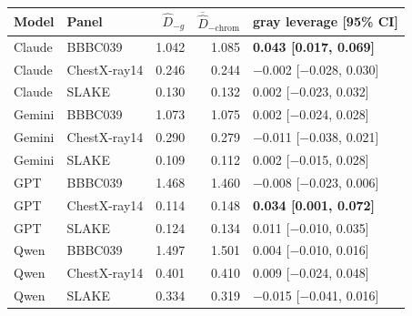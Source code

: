 \begin{tabular}{llrrl}
\toprule
Model & Panel &
$\widehat D_{-g}$ &
$\overline{\widehat D}_{-\mathrm{chrom}}$ &
gray leverage [95\% CI] \\
\midrule
Claude & BBBC039 & 1.042 & 1.085 & \textbf{0.043 [0.017, 0.069]} \\
Claude & ChestX-ray14 & 0.246 & 0.244 & $-$0.002 [$-$0.028, 0.030] \\
Claude & SLAKE & 0.130 & 0.132 & 0.002 [$-$0.023, 0.032] \\
Gemini & BBBC039 & 1.073 & 1.075 & 0.002 [$-$0.024, 0.028] \\
Gemini & ChestX-ray14 & 0.290 & 0.279 & $-$0.011 [$-$0.038, 0.021] \\
Gemini & SLAKE & 0.109 & 0.112 & 0.002 [$-$0.015, 0.028] \\
GPT & BBBC039 & 1.468 & 1.460 & $-$0.008 [$-$0.023, 0.006] \\
GPT & ChestX-ray14 & 0.114 & 0.148 & \textbf{0.034 [0.001, 0.072]} \\
GPT & SLAKE & 0.124 & 0.134 & 0.011 [$-$0.010, 0.035] \\
Qwen & BBBC039 & 1.497 & 1.501 & 0.004 [$-$0.010, 0.016] \\
Qwen & ChestX-ray14 & 0.401 & 0.410 & 0.009 [$-$0.024, 0.048] \\
Qwen & SLAKE & 0.334 & 0.319 & $-$0.015 [$-$0.041, 0.016] \\
\bottomrule
\end{tabular}
